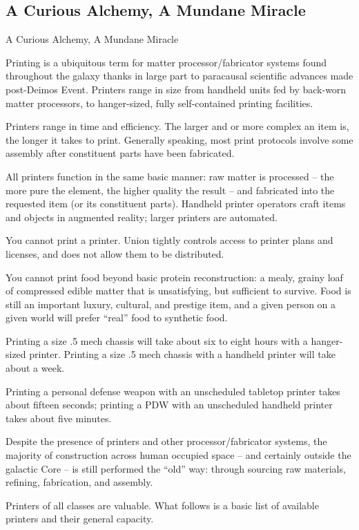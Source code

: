 \subsection{A Curious Alchemy, A Mundane Miracle}
A Curious Alchemy, A Mundane Miracle

Printing is a ubiquitous term for matter processor/fabricator systems found throughout the
galaxy thanks in large part to paracausal scientific advances made post-Deimos Event. Printers
range in size from handheld units fed by back-worn matter processors, to hanger-sized, fully
self-contained printing facilities.


Printers range in time and efficiency. The larger and or more complex an item is, the longer it
takes to print. Generally speaking, most print protocols involve some assembly after constituent
parts have been fabricated.


All printers function in the same basic manner: raw matter is processed -- the more pure the
element, the higher quality the result -- and fabricated into the requested item (or its constituent
parts). Handheld printer operators craft items and objects in augmented reality; larger printers
are automated.


You cannot print a printer. Union tightly controls access to printer plans and licenses, and does
not allow them to be distributed.


You cannot print food beyond basic protein reconstruction: a mealy, grainy loaf of compressed
edible matter that is unsatisfying, but sufficient to survive. Food is still an important luxury,
cultural, and prestige item, and a given person on a given world will prefer “real” food to
synthetic food.


Printing a size .5 mech chassis will take about six to eight hours with a hanger-sized printer.
Printing a size .5 mech chassis with a handheld printer will take about a week.


Printing a personal defense weapon with an unscheduled tabletop printer takes about fifteen
seconds; printing a PDW with an unscheduled handheld printer takes about five minutes.


Despite the presence of printers and other processor/fabricator systems, the majority of
construction across human occupied space -- and certainly outside the galactic Core -- is still
performed the “old” way: through sourcing raw materials, refining, fabrication, and assembly.


Printers of all classes are valuable. What follows is a basic list of available printers and their
general capacity.


